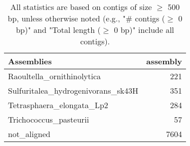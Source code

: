 \documentclass[12pt,a4paper]{article}
\begin{document}
\begin{table}[ht]
\begin{center}
\caption{All statistics are based on contigs of size $\geq$ 500 bp, unless otherwise noted (e.g., "\# contigs ($\geq$ 0 bp)" and "Total length ($\geq$ 0 bp)" include all contigs).}
\begin{tabular}{|l*{1}{|r}|}
\hline
Assemblies & assembly \\ \hline
Raoultella\_ornithinolytica & 221 \\ \hline
Sulfuritalea\_hydrogenivorans\_sk43H & 351 \\ \hline
Tetrasphaera\_elongata\_Lp2 & 284 \\ \hline
Trichococcus\_pasteurii & 57 \\ \hline
not\_aligned & 7604 \\ \hline
\end{tabular}
\end{center}
\end{table}
\end{document}
